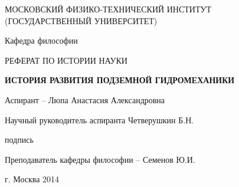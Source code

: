 \begin{titlepage}
\begin{center}
\vspace{7mm}
{МОСКОВСКИЙ ФИЗИКО-ТЕХНИЧЕСКИЙ ИНСТИТУТ \\
(ГОСУДАРСТВЕННЫЙ УНИВЕРСИТЕТ)} \\
\vspace{50mm}
{Кафедра философии \par}
\vspace{20mm}
{РЕФЕРАТ ПО ИСТОРИИ НАУКИ \par}
\vspace{15mm}
{\bf \large ИСТОРИЯ РАЗВИТИЯ ПОДЗЕМНОЙ ГИДРОМЕХАНИКИ \par}

\end{center}

\vspace{40mm}
\hspace{15mm}
{Аспирант -- Люпа Анастасия Александровна\par}
\vspace{10mm}
\hspace{15mm}
{Научный руководитель аспиранта \underline{\hspace{2.5cm}} Четверушкин Б.Н.\par}
\hspace{1mm}
\hspace{97mm}
{\tiny подпись\par}
\vspace{10mm}
\hspace{15mm}
{Преподаватель кафедры философии --  Семенов Ю.И.\par}

\vspace{\fill}

\begin{center}
{г. Москва 2014}
\end{center}

\clearpage
\end{titlepage}
\newpage